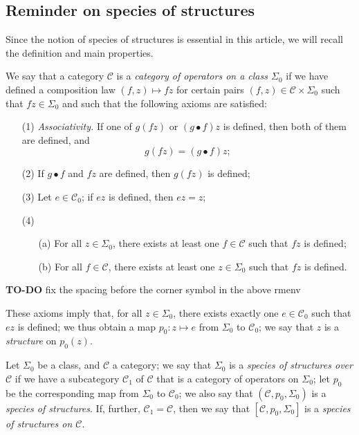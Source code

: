 \documentclass[a4paper,fleqn]{article}
\theoremstyle{plain}
\theoremstyle{definition}
\newenvironment{definition}[1]
  {\renewcommand\theinnerdefinition{#1}\innerdefinition}
  {\endinnerdefinition}
\newcommand{\todo}{{\color{purple}\textbf{TO-DO }}}
\newcommand{\CC}{\mathcal{C}}
\begin{document}
\subsection{Reminder on species of structures}
\label{section:i.2}

Since the notion of species of structures \cite{3a} is essential in this article, we will recall the definition and main properties.

\begin{definition}{1}
\label{definition:i-1}
  We say that a category $\CC$ is a \emph{category of operators on a class $\Sigma_0$} if we have defined a composition law $(f,z)\mapsto fz$ for certain pairs $(f,z)\in\CC\times\Sigma_0$ such that $fz\in\Sigma_0$ and such that the following axioms are satisfied:
  \begin{enumerate}
    \item[\normalfont(1)]
      \emph{Associativity.}
      If one of $g(fz)$ or $(g\bullet f)z$ is defined, then both of them are defined, and
      \[
        g(fz)
        = (g\bullet f)z;
      \]
    \item[\normalfont(2)]
      If $g\bullet f$ and $fz$ are defined, then $g(fz)$ is defined;
    \item[\normalfont(3)]
      Let $e\in\CC_0$;
      if $ez$ is defined, then $ez=z$;
    \item[\normalfont(4)]
      \begin{enumerate}
        \item[(a)]
          For all $z\in\Sigma_0$, there exists at least one $f\in\CC$ such that $fz$ is defined;
        \item[(b)]
          For all $f\in\CC$, there exists at least one $z\in\Sigma_0$ such that $fz$ is defined.
      \end{enumerate}
  \end{enumerate}
\end{definition}

\todo{fix the spacing before the corner symbol in the above rmenv}

These axioms imply that, for all $z\in\Sigma_0$, there exists exactly one $e\in\CC_0$ such that $ez$ is defined;
we thus obtain a map $p_0\colon z\mapsto e$ from $\Sigma_0$ to $\CC_0$;
we say that $z$ is a \emph{structure} on $p_0(z)$.

\begin{definition}{2}
\label{definition:i-2}
  Let $\Sigma_0$ be a class, and $\CC$ a category;
  we say that $\Sigma_0$ is a \emph{species of structures over $\CC$} if we have a subcategory $\CC_1$ of $\CC$ that is a category of operators on $\Sigma_0$;
  let $p_0$ be the corresponding map from $\Sigma_0$ to $\CC_0$;
  we also say that $(\CC,p_0,\Sigma_0)$ is a \emph{species of structures}.
  If, further, $\CC_1=\CC$, then we say that $[\CC,p_0,\Sigma_0]$ is a \emph{species of structures on $\CC$}.
\end{definition}
\end{document}
